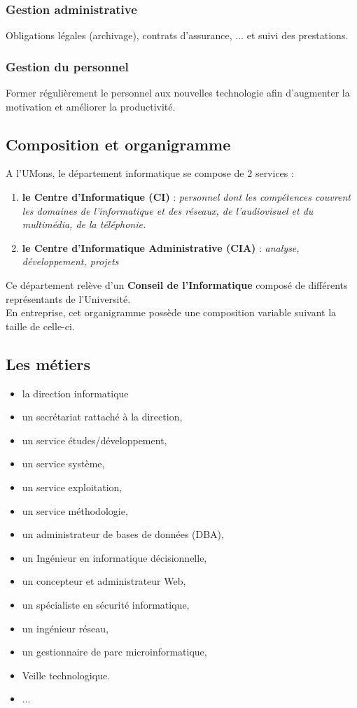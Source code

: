 \documentclass[10pt,a4paper,oneside,titlepage]{report}
\newcommand{\firebrick}[1]{\textcolor{firebrick4}{#1}}
\newcommand{\titre}[1]{\textcolor{title}{#1}}
\newcommand{\newterm}[1]{\textit{#1}}
\newcommand{\strong}[1]{\textbf{\titre{#1}}}
\begin{document}
\subsubsection{Gestion administrative}

Obligations légales (archivage), contrats d'assurance, ... et suivi des prestations.

\subsubsection{Gestion du personnel}

Former régulièrement le personnel aux nouvelles technologie afin d'augmenter la motivation et améliorer la productivité.

\subsection{Composition et organigramme}

\noindent A l'UMons, le département informatique se compose de $2$ services :
\begin{enumerate}
\item \textbf{\strong{le Centre d'Informatique} (\firebrick{CI})} : \newterm{personnel dont les compétences couvrent les domaines de l'informatique et des réseaux, de
l'audiovisuel et du multimédia, de la téléphonie.}
\item \textbf{\strong{le Centre d'Informatique Administrative} (\firebrick{CIA})} : \newterm{analyse, développement, projets}
\end{enumerate}
Ce département relève d'un \strong{Conseil de l'Informatique} composé de différents représentants de l'Université.\\
En entreprise, cet organigramme possède une composition variable suivant la taille de celle-ci.

\subsection{Les métiers}

\begin{itemize}
\item la direction informatique
\item un secrétariat rattaché à la direction,
\item un service études/développement,
\item un service système,
\item un service exploitation,
\item un service méthodologie,
\item un administrateur de bases de données (DBA),
\item un Ingénieur en informatique décisionnelle,
\item un concepteur et administrateur Web,
\item un spécialiste en sécurité informatique,
\item un ingénieur réseau,
\item un gestionnaire de parc microinformatique,
\item Veille technologique.
\item ...
\end{itemize}
\end{document}
